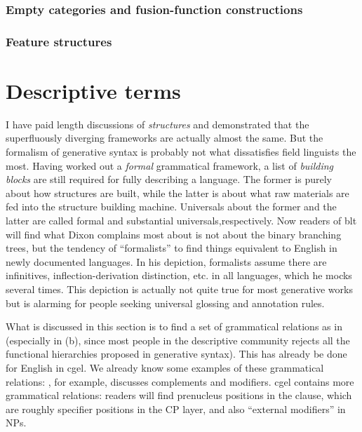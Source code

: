 \documentclass[../main.tex]{subfiles}
\begin{document}
\subsubsection{Empty categories and fusion-function constructions}

\subsubsection{Feature structures}


\section{Descriptive terms}\label{sec:descriptive-terms}

I have paid length discussions of \emph{structures} 
and demonstrated that the superfluously diverging frameworks are actually almost the same. 
But the formalism of generative syntax is probably not what dissatisfies field linguists the most.
Having worked out a \emph{formal} grammatical framework, 
a list of \emph{building blocks} are still required for fully describing a language. 
The former is purely about how structures are built, 
while the latter is about what raw materials are fed into the structure building machine. 
Universals about the former and the latter are called formal and substantial universals,respectively. 
Now readers of \ac{blt} will find 
what Dixon complains most about is not about the binary branching trees, 
but the tendency of ``formalists'' to find things equivalent to English in newly documented languages. 
In his depiction, formalists assume there are infinitives, 
inflection-derivation distinction, etc. in all languages, which he mocks several times. 
This depiction is actually not quite true for most generative works 
but is alarming for people seeking universal glossing and annotation rules.

What is discussed in this section is to find a set of grammatical relations 
as in  (especially in (b), 
since most people in the descriptive community rejects 
all the functional hierarchies proposed in generative syntax).
This has already be done for English in \ac{cgel}. 
We already know some examples of these grammatical relations: 
, for example, discusses complements and modifiers.
\ac{cgel} contains more grammatical relations: 
readers will find prenucleus positions in the clause, 
which are roughly specifier positions in the CP layer,
and also ``external modifiers'' in NPs. %
\end{document}
